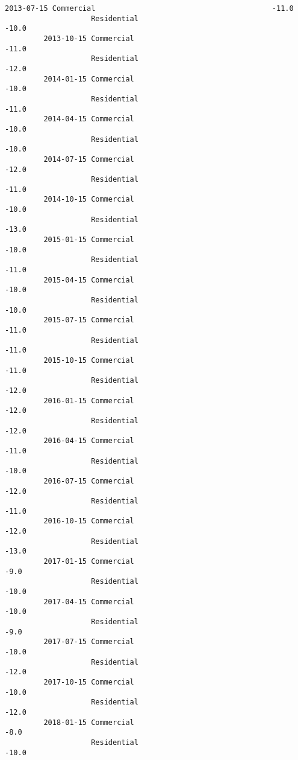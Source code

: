 \documentclass[11pt]{article}
\begin{document}
\begin{Verbatim}[commandchars=\\\{\}]
         2013-07-15 Commercial                                         -11.0   
                    Residential                                        -10.0   
         2013-10-15 Commercial                                         -11.0   
                    Residential                                        -12.0   
         2014-01-15 Commercial                                         -10.0   
                    Residential                                        -11.0   
         2014-04-15 Commercial                                         -10.0   
                    Residential                                        -10.0   
         2014-07-15 Commercial                                         -12.0   
                    Residential                                        -11.0   
         2014-10-15 Commercial                                         -10.0   
                    Residential                                        -13.0   
         2015-01-15 Commercial                                         -10.0   
                    Residential                                        -11.0   
         2015-04-15 Commercial                                         -10.0   
                    Residential                                        -10.0   
         2015-07-15 Commercial                                         -11.0   
                    Residential                                        -11.0   
         2015-10-15 Commercial                                         -11.0   
                    Residential                                        -12.0   
         2016-01-15 Commercial                                         -12.0   
                    Residential                                        -12.0   
         2016-04-15 Commercial                                         -11.0   
                    Residential                                        -10.0   
         2016-07-15 Commercial                                         -12.0   
                    Residential                                        -11.0   
         2016-10-15 Commercial                                         -12.0   
                    Residential                                        -13.0   
         2017-01-15 Commercial                                          -9.0   
                    Residential                                        -10.0   
         2017-04-15 Commercial                                         -10.0   
                    Residential                                         -9.0   
         2017-07-15 Commercial                                         -10.0   
                    Residential                                        -12.0   
         2017-10-15 Commercial                                         -10.0   
                    Residential                                        -12.0   
         2018-01-15 Commercial                                          -8.0   
                    Residential                                        -10.0   
         

\end{Verbatim}
\end{document}
